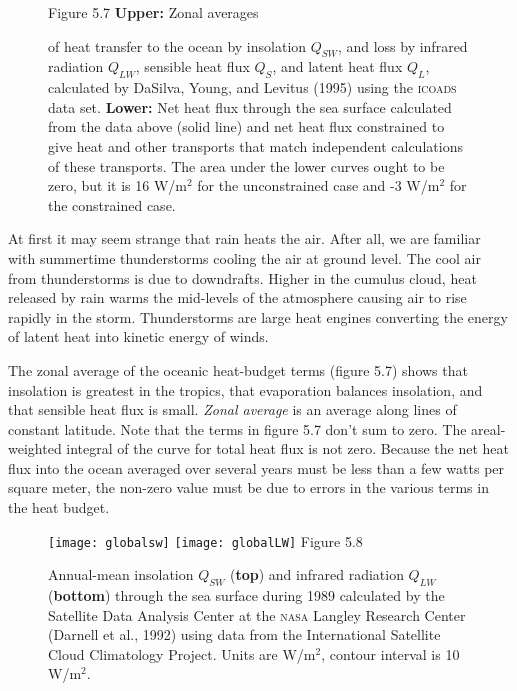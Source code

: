 \begin{figure}[b!]
\vspace{-2ex}
\footnotesize
Figure 5.7 \textbf{Upper:} Zonal averages \rule{0mm}{4ex}of heat
transfer to the ocean by insolation
$Q_{SW}$, and loss by infrared radiation $Q_{LW}$, sensible heat
flux $Q_S$, and latent heat
flux $Q_L$, calculated by DaSilva, Young, and Levitus (1995) using the
\textsc{icoads} data set.  \textbf{Lower:} Net heat flux through the
sea surface calculated from the data above (solid line) and net heat
flux constrained to give heat and other
transports that match independent calculations of these
transports. The area under the lower curves ought to be zero, but it
is 16 W/m$^2$ for the unconstrained case and -3 W/m$^2$ for the
constrained case.
\label{fig:zonalaveheat}
\end{figure}

At first it may seem strange that rain heats the air. After all, we
are familiar with summertime thunderstorms cooling the air at ground
level. The cool air from thunderstorms is due to downdrafts. Higher in
the cumulus cloud, heat released by rain warms the mid-levels of the
atmosphere causing air to rise rapidly in the storm. Thunderstorms are
large heat engines converting the energy of latent heat into kinetic
energy of winds.

The zonal average of the oceanic heat-budget terms (figure 5.7) shows
that insolation is greatest in the
tropics, that evaporation balances
insolation, and that
sensible heat flux is small.
\textit{Zonal average} is an
average along lines of constant latitude. Note that the terms in
figure 5.7 don't sum to zero. The areal-weighted integral of the curve
for total heat flux is not
zero. Because the net heat flux into
the ocean averaged over several years must be less than a few watts
per square meter, the non-zero value must be due to errors in the
various terms in the heat budget.

\begin{figure}[t!]
\texttt{[image: globalsw]}
\texttt{[image: globalLW]}
\footnotesize
Figure 5.8 \rule{0mm}{3ex}Annual-mean
insolation $Q_{SW}$ (\textbf{top})
and infrared radiation $Q_{LW}$ (\textbf{bottom}) through the sea
surface during 1989 calculated by the Satellite Data Analysis Center
at the \textsc{nasa} Langley Research Center (Darnell et al., 1992)
using data from the International Satellite Cloud Climatology
Project. Units are W/m$^2$, contour interval is 10 W/m$^2$.
\label{fig:globalSW}
\vspace{-4ex}
\end{figure}

